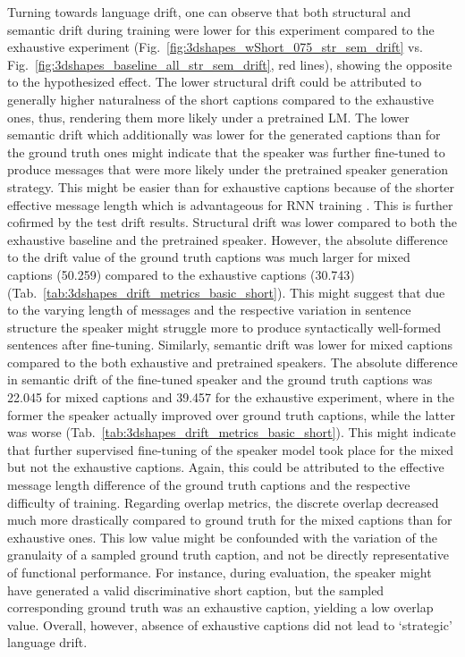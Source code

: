Turning towards language drift, one can observe that both structural and semantic drift during training were lower for this experiment compared to the exhaustive experiment (Fig.~\ref{fig:3dshapes_wShort_075_str_sem_drift} vs. Fig.~\ref{fig:3dshapes_baseline_all_str_sem_drift}, red lines), showing the opposite to the hypothesized effect. The lower structural drift could be attributed to generally higher naturalness of the short captions compared to the exhaustive ones, thus, rendering them more likely under a pretrained LM. The lower semantic drift which additionally was lower for the generated captions than for the ground truth ones might indicate that the speaker was further fine-tuned to produce messages that were more likely under the pretrained speaker generation strategy. This might be easier than for exhaustive captions because of the shorter effective message length which is advantageous for RNN training \parencite[cf.][]{jaeger2002tutorial}. This is further cofirmed by the test drift results. Structural drift was lower compared to both the exhaustive baseline and the pretrained speaker. However, the absolute difference to the drift value of the ground truth captions was much larger for mixed captions (50.259) compared to the exhaustive captions (30.743) (Tab.~\ref{tab:3dshapes_drift_metrics_basic_short}). This might suggest that due to the varying length of messages and the respective variation in sentence structure the speaker might struggle more to produce syntactically well-formed sentences after fine-tuning. 
Similarly, semantic drift was lower for mixed captions compared to the both exhaustive and pretrained speakers. The absolute difference in semantic drift of the fine-tuned speaker and the ground truth captions was 22.045 for mixed captions and 39.457 for the exhaustive experiment, where in the former the speaker actually improved over ground truth captions, while the latter was worse (Tab.~\ref{tab:3dshapes_drift_metrics_basic_short}). This might indicate that further supervised fine-tuning of the speaker model took place for the mixed but not the exhaustive captions. Again, this could be attributed to the effective message length difference of the ground truth captions and the respective difficulty of training.
Regarding overlap metrics, the discrete overlap decreased much more drastically compared to ground truth for the mixed captions than for exhaustive ones. This low value might be confounded with the variation of the granulaity of a sampled ground truth caption, and not be directly representative of functional performance. For instance, during evaluation, the speaker might have generated a valid discriminative short caption, but the sampled corresponding ground truth was an exhaustive caption, yielding a low overlap value. Overall, however, absence of exhaustive captions did not lead to `strategic' language drift.  

